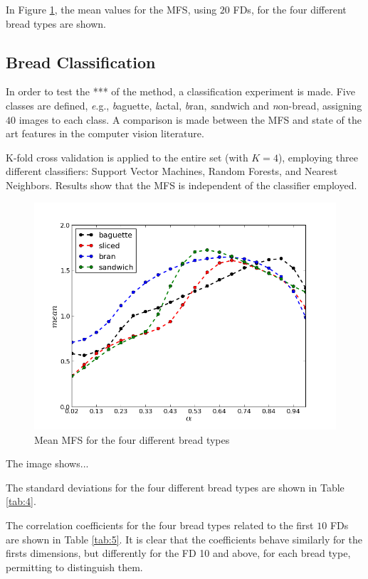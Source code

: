 In Figure \ref{fig:meansMFS}, the mean values for the MFS, using $20$ FDs, for the four different bread types are shown.

\subsection{Bread Classification}
\label{sec:10}

In order to test the *** of the method, a classification experiment is made. Five classes are defined, {\emph e.g.}, {\emph baguette}, {\emph lactal}, {\emph bran}, {\emph sandwich} and {\emph non-bread}, assigning $40$ images to each class. A comparison is made between the MFS and state of the art features in the computer vision literature.

K-fold cross validation is applied to the entire set (with $K=4$), employing three different classifiers: Support Vector Machines, Random Forests, and Nearest Neighbors. Results show that the MFS is independent of the classifier employed.

\begin{figure}[htb]
\centering
\includegraphics[scale=0.38]{../images/means}
\caption{Mean MFS for the four different bread types}
\label{fig:meansMFS}
\end{figure}

The image shows...

The standard deviations for the four different bread types are shown in Table \ref{tab:4}. 


The correlation coefficients for the four bread types related to the first $10$ FDs are shown in Table \ref{tab:5}. It is clear that the coefficients behave similarly for the firsts dimensions, but differently for the FD 10 and above, for each bread type, permitting to distinguish them.



